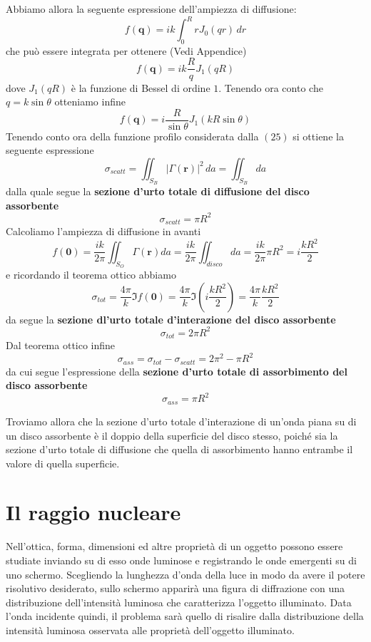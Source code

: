 Abbiamo allora la seguente espressione dell'ampiezza di diffusione:
\[
	f(\bm{q}) = ik \int_0^R r J_0(qr) \, dr
\] che può essere integrata per ottenere (Vedi Appendice)
\[
	f(\bm{q}) = ik \frac{R}{q} J_1(qR)
\]
dove \(J_1(qR)\) è la funzione di Bessel di ordine \(1\).
Tenendo ora conto che \(q = k \sin \theta\) otteniamo infine
\begin{equation}
	f(\bm{q}) = i \frac{R}{\sin \theta} J_1(kR \sin \theta)
\end{equation}
Tenendo conto ora della funzione profilo considerata dalla \((25)\) si ottiene la seguente espressione
\[
	\sigma_{scatt} = \iint_{S_B} |\Gamma(\bm{r})|^2 \, da = \iint_{S_B} da
\]
dalla quale segue la \textbf{sezione d'urto totale di diffusione del disco assorbente}
\begin{equation}
	\sigma_{scatt} = \pi R^2
\end{equation}
Calcoliamo l'ampiezza di diffusione in avanti
\[
	f(\bm{0}) = \frac{ik}{2 \pi} \iint_{S_O} \Gamma (\bm{r}) da = \frac{ik}{2 \pi} \iint_{disco} da = \frac{ik}{2 \pi}
	\pi R^2 = i \frac{kR^2}{2}
\] e ricordando il teorema ottico abbiamo
\[
	\sigma_{tot} = \frac{4 \pi}{k} \Im f(\bm{0}) = \frac{4 \pi}{k} \Im \left(i  \frac{kR^2}{2}\right) = \frac{4 \pi}{k}\frac{kR^2}{2}
\]
da segue la \textbf{sezione dl'urto totale d'interazione del disco assorbente}
\begin{equation}
	\sigma_{tot} = 2 \pi R^2
\end{equation}
Dal teorema ottico infine
\[
	\sigma_{ass} = \sigma_{tot} - \sigma_{scatt} = 2\pi ^2 - \pi R^2
\] da cui segue l'espressione della \textbf{sezione d'urto totale di
assorbimento del disco assorbente}
\begin{equation}
	\sigma_{ass} = \pi R^2
\end{equation}

Troviamo allora che la sezione d'urto totale d'interazione di un'onda
piana su di un disco assorbente è il doppio della superficie del disco
stesso, poiché sia la sezione d'urto totale di diffusione che quella di
assorbimento hanno entrambe il valore di quella superficie.
\section{Il raggio nucleare}\label{sec:raggio-nucleare}
Nell'ottica, forma, dimensioni ed altre proprietà di un oggetto possono
essere studiate inviando su di esso onde luminose e registrando le onde
emergenti su di uno schermo. Scegliendo la lunghezza d'onda della luce
in modo da avere il potere risolutivo desiderato, sullo schermo apparirà
una figura di diffrazione con una distribuzione dell'intensità luminosa
che caratterizza l'oggetto illuminato. Data l'onda incidente quindi, il
problema sarà quello di risalire dalla distribuzione della intensità
luminosa osservata alle proprietà dell'oggetto illuminato.

